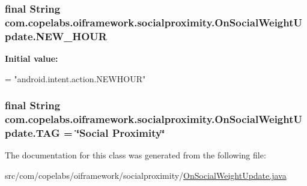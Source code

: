 \subsubsection[{N\+E\+W\+\_\+\+H\+O\+U\+R}]{\setlength{\rightskip}{0pt plus 5cm}final String com.\+copelabs.\+oiframework.\+socialproximity.\+On\+Social\+Weight\+Update.\+N\+E\+W\+\_\+\+H\+O\+U\+R\hspace{0.3cm}{\ttfamily [static]}}\label{classcom_1_1copelabs_1_1oiframework_1_1socialproximity_1_1_on_social_weight_update_afdd66acab94bdf2041f5b728d96df31d}
{\bfseries Initial value\+:}
\begin{DoxyCode}
=
            \textcolor{stringliteral}{"android.intent.action.NEWHOUR"}
\end{DoxyCode}
\hypertarget{classcom_1_1copelabs_1_1oiframework_1_1socialproximity_1_1_on_social_weight_update_a3bbf5341c4fb269f389aefe1e2ea7349}{}
\subsubsection[{T\+A\+G}]{\setlength{\rightskip}{0pt plus 5cm}final String com.\+copelabs.\+oiframework.\+socialproximity.\+On\+Social\+Weight\+Update.\+T\+A\+G = \char`\"{}Social Proximity\char`\"{}\hspace{0.3cm}{\ttfamily [private]}}\label{classcom_1_1copelabs_1_1oiframework_1_1socialproximity_1_1_on_social_weight_update_a3bbf5341c4fb269f389aefe1e2ea7349}


The documentation for this class was generated from the following file\+:\begin{DoxyCompactItemize}
\item 
src/com/copelabs/oiframework/socialproximity/\hyperlink{_on_social_weight_update_8java}{On\+Social\+Weight\+Update.\+java}\end{DoxyCompactItemize}
